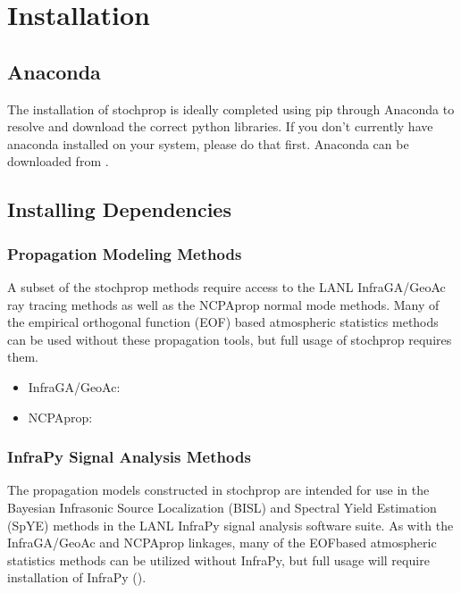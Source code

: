 \documentclass[letterpaper,10pt,english]{sphinxmanual}
\begin{document}


\section{Installation}
\label{\detokenize{installation:installation}}\label{\detokenize{installation:id1}}\label{\detokenize{installation::doc}}

\subsection{Anaconda}
\label{\detokenize{installation:anaconda}}
The installation of stochprop is ideally completed using pip through Anaconda to resolve and download the correct python libraries. If you don’t currently have anaconda installed
on your system, please do that first.  Anaconda can be downloaded from .


\subsection{Installing Dependencies}
\label{\detokenize{installation:installing-dependencies}}

\subsubsection{Propagation Modeling Methods}
\label{\detokenize{installation:propagation-modeling-methods}}
A subset of the stochprop methods require access to the  LANL InfraGA/GeoAc ray tracing methods as well as the NCPAprop normal mode methods.  Many of the
empirical orthogonal function (EOF) based atmospheric statistics methods can be used without these propagation tools, but full usage of stochprop requires them.
\begin{itemize}
\item {} 
InfraGA/GeoAc: 

\item {} 
NCPAprop: 

\end{itemize}


\subsubsection{InfraPy Signal Analysis Methods}
\label{\detokenize{installation:infrapy-signal-analysis-methods}}
The propagation models constructed in stochprop are intended for use in the Bayesian Infrasonic Source Localization (BISL) and Spectral Yield Estimation (SpYE)
methods in the LANL InfraPy signal analysis software suite.  As with the InfraGA/GeoAc and NCPAprop linkages, many of the EOF\sphinxhyphen{}based atmospheric statistics methods
can be utilized without InfraPy, but full usage will require installation of InfraPy ().
\end{document}
